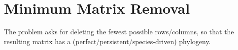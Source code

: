 \section{Minimum Matrix Removal}

The problem asks for deleting the fewest possible rows/columns, so that the resulting matrix has a (perfect/persistent/species-driven) phylogeny.
